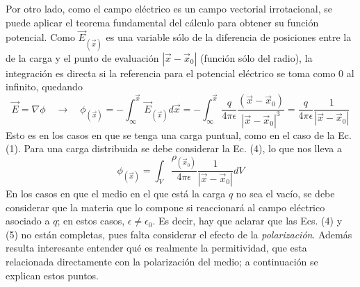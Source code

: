 \documentclass[12pt, notitlepage]{article}
\begin{document}
Por otro lado, como el campo eléctrico es un campo vectorial irrotacional, se puede aplicar el teorema fundamental del cálculo para obtener su función potencial. Como $\vec{E}_{(\vec{x})}$ es una variable sólo de la diferencia de posiciones entre la de la carga y el punto de evaluación $|\vec{x} - \vec{x}_0|$ (función sólo del radio), la integración es directa si la referencia para el potencial eléctrico se toma como $0$ al infinito, quedando
\begin{equation}
 \vec{E} = \nabla\phi \quad\rightarrow\quad\phi_{(\vec{x})} = -\int_\infty^{\vec{x}} \vec{E}_{(\vec{x})} d\vec{x} = -\int_\infty^{\vec{x}} \frac{q}{4\pi\epsilon}\frac{(\vec{x}-\vec{x}_0)}{|\vec{x} - \vec{x}_0|^3} = \frac{q}{4\pi\epsilon}\frac{1}{|\vec{x} - \vec{x}_0|}
\end{equation}
Esto es en los casos en que se tenga una carga puntual, como en el caso de la Ec. (1). Para una carga distribuida se debe considerar la Ec. (4), lo que nos lleva a
\begin{equation}
\phi_{(\vec{x})} = \int_V \frac{\rho_{(\vec{x}_0)}}{4\pi\epsilon}\frac{1}{|\vec{x}-\vec{x}_0|}dV
\end{equation}
En los casos en que el medio en el que está la carga $q$ no sea el vacío, se debe considerar que la materia que lo compone si reaccionará al campo eléctrico asociado a $q$; en estos casos, $\epsilon \neq \epsilon_0$. Es decir, hay que aclarar que las Ecs. (4) y (5) no están completas, pues falta considerar el efecto de la \textit{polarización}. Además resulta interesante entender qué es realmente la permitividad, que esta relacionada directamente con la polarización del medio; a continuación se explican estos puntos.
\end{document}
